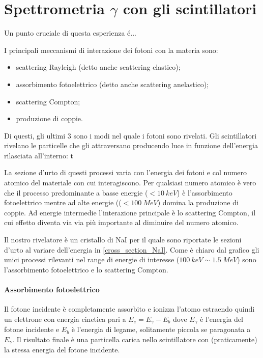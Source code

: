 \section{Spettrometria $\gamma$ con gli scintillatori}
Un punto cruciale di questa esperienza é...

I principali meccanismi di interazione dei fotoni con la materia sono:
\begin{itemize}
	\item scattering Rayleigh (detto anche scattering elastico);
	\item assorbimento fotoelettrico (detto anche scattering anelastico);
	\item scattering Compton;
	\item produzione di coppie.
\end{itemize}
 Di questi, gli ultimi 3 sono i modi nel quale i fotoni sono rivelati.
 Gli scintillatori rivelano le particelle che gli attraversano producendo luce in funzione dell'energia rilasciata all'interno: t
 
 La sezione d'urto di questi processi varia con l'energia dei fotoni e col numero atomico del materiale con cui interagiscono.
 Per qualsiasi numero atomico è vero che il processo predominante a basse energie ($< \SI{10}{keV}$) è l'assorbimento fotoelettrico mentre ad alte energie (($< \SI{100}{MeV}$) domina la produzione di coppie. Ad energie intermedie l'interazione principale è lo scattering Compton, il cui effetto diventa via via più importante al diminuire del numero atomico. 
 
 Il nostro rivelatore è un cristallo di NaI per il quale sono riportate le sezioni d'urto al variare dell'energia in \autoref{cross_section_NaI}.
 Come è chiaro dal grafico gli unici processi rilevanti nel range di energie di interesse ($\SI{100}{keV} \sim \SI{1.5}{MeV}$) sono l'assorbimento fotoelettrico e lo scattering Compton.
 
 \paragraph{Assorbimento fotoelettrico}
 Il fotone incidente è completamente assorbito e ionizza l'atomo estraendo quindi un elettrone con energia cinetica pari a $E_e = E_{\gamma} - E_b$ dove $E_{\gamma}$ è l'energia del fotone incidente e $E_b$ è l'energia di legame, solitamente piccola se paragonata a $E_{\gamma}$. Il risultato finale è una particella carica nello scintillatore con (praticamente) la stessa energia del fotone incidente.
 
